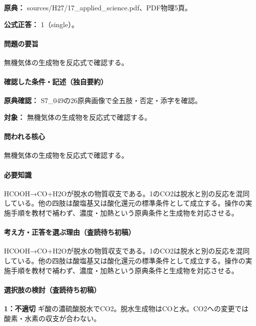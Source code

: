 \noindent\textbf{原典：} sources/H27/17\_applied\_science.pdf、PDF物理5頁。

\textbf{公式正答：} 1（single）。

\paragraph{問題の要旨} 無機気体の生成物を反応式で確認する。

\paragraph{確認した条件・記述（独自要約）}\mbox{}\par

\noindent\textbf{原典確認：} S7\_049の26原典画像で全五肢・否定・添字を確認。\par

\noindent\textbf{対象：} 無機気体の生成物を反応式で確認する。\par

\paragraph{問われる核心} 無機気体の生成物を反応式で確認する。

\paragraph{必要知識} HCOOH→CO+H2Oが脱水の物質収支である。1のCO2は脱水と別の反応を混同している。他の四肢は酸塩基又は酸化還元の標準条件として成立する。操作の実施手順を教材で補わず、濃度・加熱という原典条件と生成物を対応させる。

\paragraph{考え方・正答を選ぶ理由（査読待ち初稿）} HCOOH→CO+H2Oが脱水の物質収支である。1のCO2は脱水と別の反応を混同している。他の四肢は酸塩基又は酸化還元の標準条件として成立する。操作の実施手順を教材で補わず、濃度・加熱という原典条件と生成物を対応させる。

\paragraph{選択肢の検討（査読待ち初稿）}\mbox{}\par

\noindent\textbf{1：不適切} ギ酸の濃硫酸脱水でCO2。脱水生成物はCOと水。CO2への変更では酸素・水素の収支が合わない。\par

